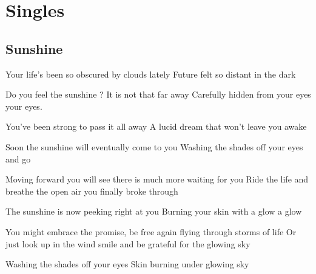 \documentclass{article}
\newenvironment{album}[1]%
{%
  \section*{#1}
}%
{%
}
\newenvironment{song}[1]%
{%
  \subsection*{\textbf{#1}}
  \begin{multicols*}{2}
}%
{%
  \end{multicols*}
  \newpage
}
\newenvironment{couplet} %
{%
  \verbatim
}%
{% end code
  \endverbatim
}
\newenvironment{refrain} %
{%
  \verbatim
}%
{% end code
  \endverbatim
}
\newenvironment{pont} %
{%
  \verbatim
}%
{% end code
  \endverbatim
}
\begin{document}
\begin{album}{Singles}
\begin{song}{Sunshine}
\begin{couplet}
Your life's been so obscured by clouds lately
Future felt so distant in the dark
\end{couplet}
\begin{refrain}
Do you feel the sunshine ?
It is not that far away
Carefully hidden from your eyes
your eyes.
\end{refrain}
\begin{couplet}
You've been strong to pass it all away
A lucid dream that won't leave you awake 
\end{couplet}
\begin{refrain}
Soon the sunshine will eventually come to you
Washing the shades off your eyes
and go
\end{refrain}
\begin{couplet}
Moving forward you will see there is much more waiting for you
Ride the life and breathe the open air you finally broke through
\end{couplet}
\begin{refrain}
The sunshine is now peeking right at you
Burning your skin with a glow
a glow
\end{refrain}
\begin{pont}
You might embrace the promise, be free again flying through storms of life
Or just look up in the wind smile and be grateful for the glowing sky
\end{pont}
\begin{refrain}
Washing the shades off your eyes
Skin burning under glowing sky 
\end{refrain}

\end{song}

\end{album}
\end{document}
